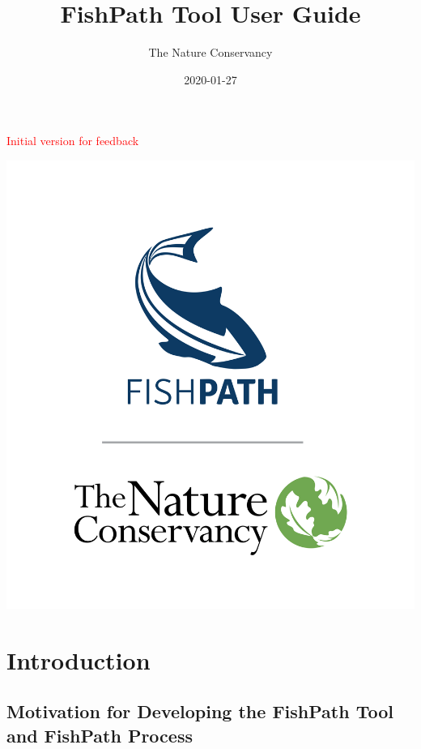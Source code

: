 \documentclass[11pt,]{book}
\title{FishPath Tool User Guide}
\author{The Nature Conservancy}
\date{2020-01-27}
\begin{document}
\maketitle

\hypertarget{section}{%
\chapter*{}\label{section}}

\textcolor{red}{Initial version for feedback}

\begin{center}\includegraphics[width=0.75\linewidth]{images/fishpath-tnc-vertical} \end{center}

\hypertarget{intro}{%
\chapter{Introduction}\label{intro}}

\hypertarget{motivation}{%
\section{Motivation for Developing the FishPath Tool and FishPath
Process}\label{motivation}}
\end{document}
